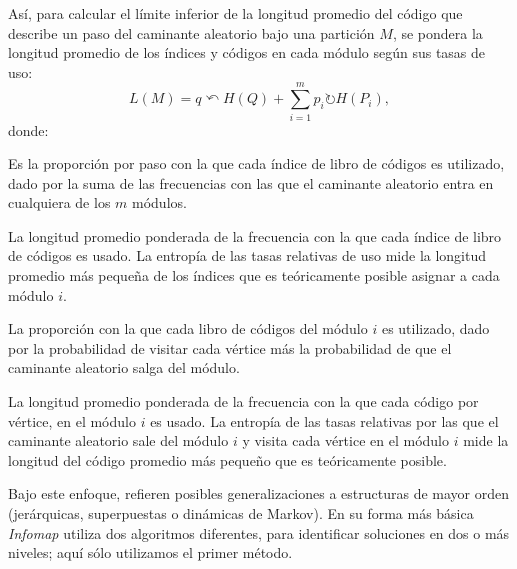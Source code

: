 \documentclass[letterpaper, 11pt]{book}
\theoremstyle{definition}
\theoremstyle{remark}
\begin{document}
Así, para calcular el límite inferior de la longitud promedio del código que describe un paso del caminante aleatorio bajo una partición $M$, se pondera la longitud promedio de los índices y códigos en cada módulo según sus tasas de uso: 
\begin{equation}\label{eq:map_eq}
    L(M) = q\curvearrowleft H(Q) + \sum_{i=1}^{m}p_{i}\circlearrowright H(P_{i}), 
\end{equation} 
donde: 
\begin{description}
    \setlength\itemsep{0em}
    \item[$\mathbf{ q\curvearrowleft } = \sum_{i=1}^{m}q_{i}\curvearrowleft $.] Es la proporción por paso con la que cada índice de libro de códigos es utilizado, dado por la suma de las frecuencias con las que el caminante aleatorio entra en cualquiera de los $m$ módulos. 
    \item[$\mathbf{ H(Q) } = -\sum_{i=1}^{m}(q_{i}\curvearrowleft/q\curvearrowleft)\log(q_{i}\curvearrowleft/q\curvearrowleft) $.] La longitud promedio ponderada de la frecuencia con la que cada índice de libro de códigos es usado. La entropía de las tasas relativas de uso mide la longitud promedio más pequeña de los índices que es teóricamente posible asignar a cada módulo $i$. 
    \item[$\mathbf{ p_{i}\circlearrowright } = \sum_{\alpha\text{ }\epsilon\text{ }i}p_{\alpha}+q_{i}\curvearrowright $.] La proporción con la que cada libro de códigos del módulo $i$ es utilizado, dado por la probabilidad de visitar cada vértice más la probabilidad de que el caminante aleatorio salga del módulo. 
    \item[$\mathbf{ H(P_{i}) } = -(q_{i}\curvearrowright/p_{i}\circlearrowright)\log(q_{i}\curvearrowright/p_{i}\circlearrowright)-\sum_{\alpha\text{ }\epsilon\text{ }i}(p_{\alpha}/p_{i}\circlearrowright)\log(p_{\alpha}/p_{i}\circlearrowright) $.] La longitud promedio ponderada de la frecuencia con la que cada código por vértice, en el módulo $i$ es usado. La entropía de las tasas relativas por las que el caminante aleatorio sale del módulo $i$ y visita cada vértice en el módulo $i$ mide la longitud del código promedio más pequeño que es teóricamente posible. 
\end{description}


Bajo este enfoque, \citet{2014_Rosvall_CommunityMapEq} refieren posibles generalizaciones a estructuras de mayor orden (jerárquicas, superpuestas o dinámicas de Markov). 
En su forma más básica \emph{Infomap} utiliza dos algoritmos diferentes, para identificar soluciones en dos o más niveles; aquí sólo utilizamos el primer método. 
\end{document}
